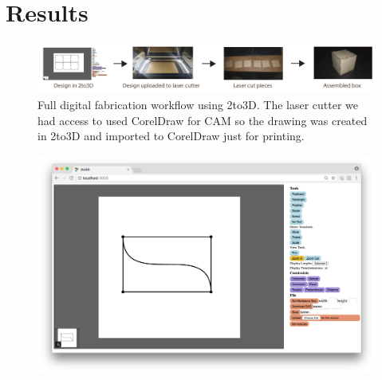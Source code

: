 
\section{Results}

%
%
%	
%
%


\begin{figure}[H]
  \includegraphics[width=\linewidth]{output}
  \caption{Full digital fabrication workflow using 2to3D. The laser cutter we had access to used CorelDraw for CAM so the drawing was created in 2to3D and imported to CorelDraw just for printing.}
  \label{fig:output}
\end{figure}

\begin{figure}[H]
  \includegraphics[width=\linewidth]{screenshot.png}
  \caption{}
  \label{fig:screenshot}
\end{figure}

